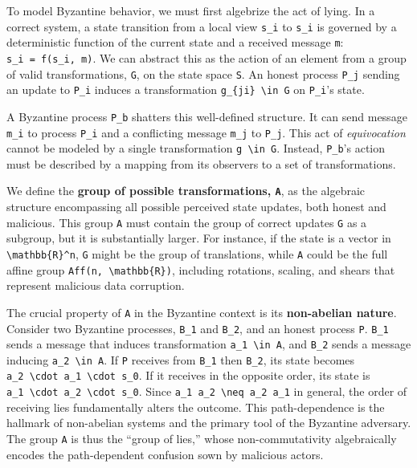 \documentclass[
]{article}
\begin{document}
To model Byzantine behavior, we must first algebrize the act of lying.
In a correct system, a state transition from a local view \texttt{s\_i}
to \texttt{s\textquotesingle{}\_i} is governed by a deterministic
function of the current state and a received message \texttt{m}:
\texttt{s\textquotesingle{}\_i\ =\ f(s\_i,\ m)}. We can abstract this as
the action of an element from a group of valid transformations,
\texttt{G}, on the state space \texttt{S}. An honest process
\texttt{P\_j} sending an update to \texttt{P\_i} induces a
transformation \texttt{g\_\{ji\}\ \textbackslash{}in\ G} on
\texttt{P\_i}'s state.

A Byzantine process \texttt{P\_b} shatters this well-defined structure.
It can send message \texttt{m\_i} to process \texttt{P\_i} and a
conflicting message \texttt{m\_j} to \texttt{P\_j}. This act of
\emph{equivocation} cannot be modeled by a single transformation
\texttt{g\ \textbackslash{}in\ G}. Instead, \texttt{P\_b}'s action must
be described by a mapping from its observers to a set of
transformations.

We define the \textbf{group of possible transformations, \texttt{A}}, as
the algebraic structure encompassing all possible perceived state
updates, both honest and malicious. This group \texttt{A} must contain
the group of correct updates \texttt{G} as a subgroup, but it is
substantially larger. For instance, if the state is a vector in
\texttt{\textbackslash{}mathbb\{R\}\^{}n}, \texttt{G} might be the group
of translations, while \texttt{A} could be the full affine group
\texttt{Aff(n,\ \textbackslash{}mathbb\{R\})}, including rotations,
scaling, and shears that represent malicious data corruption.

The crucial property of \texttt{A} in the Byzantine context is its
\textbf{non-abelian nature}. Consider two Byzantine processes,
\texttt{B\_1} and \texttt{B\_2}, and an honest process \texttt{P}.
\texttt{B\_1} sends a message that induces transformation
\texttt{a\_1\ \textbackslash{}in\ A}, and \texttt{B\_2} sends a message
inducing \texttt{a\_2\ \textbackslash{}in\ A}. If \texttt{P} receives
from \texttt{B\_1} then \texttt{B\_2}, its state becomes
\texttt{a\_2\ \textbackslash{}cdot\ a\_1\ \textbackslash{}cdot\ s\_0}.
If it receives in the opposite order, its state is
\texttt{a\_1\ \textbackslash{}cdot\ a\_2\ \textbackslash{}cdot\ s\_0}.
Since \texttt{a\_1\ a\_2\ \textbackslash{}neq\ a\_2\ a\_1} in general,
the order of receiving lies fundamentally alters the outcome. This
path-dependence is the hallmark of non-abelian systems and the primary
tool of the Byzantine adversary. The group \texttt{A} is thus the
``group of lies,'' whose non-commutativity algebraically encodes the
path-dependent confusion sown by malicious actors.
\end{document}
